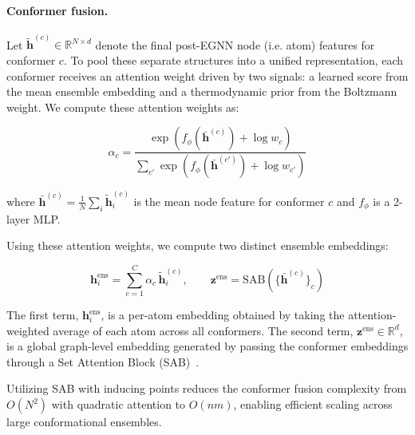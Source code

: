 \documentclass{article}
\begin{document}
\paragraph{Conformer fusion.}
Let $\tilde{\mathbf{h}}^{(c)} \in \mathbb{R}^{N \times d}$ denote the final post-EGNN node (i.e. atom) features for conformer $c$. To pool these separate structures into a unified representation, each conformer receives an attention weight driven by two signals: a learned score from the mean ensemble embedding and a thermodynamic prior from the Boltzmann weight. We compute these attention weights as:

\begin{equation}
  \alpha_c = \frac{\exp\!\left(f_\phi(\bar{\mathbf{h}}^{(c)}) + \log w_c\right)}
  {\sum_{c'}\exp\!\left(f_\phi(\bar{\mathbf{h}}^{(c')}) + \log w_{c'}\right)}
\end{equation}

where $\bar{\mathbf{h}}^{(c)} = \frac{1}{N}\sum_i \tilde{\mathbf{h}}_i^{(c)}$ is the mean node feature for conformer $c$ and $f_\phi$ is a 2-layer MLP. 

Using these attention weights, we compute two distinct ensemble embeddings:

\begin{equation}
  \mathbf{h}_i^{\mathrm{ens}} = \sum_{c=1}^C \alpha_c\,\tilde{\mathbf{h}}_i^{(c)},
  \qquad
  \mathbf{z}^{\mathrm{ens}} = \mathrm{SAB}\!\left(\{\bar{\mathbf{h}}^{(c)}\}_c\right)
\end{equation}

The first term, $\mathbf{h}_i^{\mathrm{ens}}$, is a per-atom embedding obtained by taking the attention-weighted average of each atom across all conformers. The second term, $\mathbf{z}^{\mathrm{ens}} \in \mathbb{R}^d$, is a global graph-level embedding generated by passing the conformer embeddings through a Set Attention Block (SAB)~\citep{lee2019set}. 

Utilizing SAB with inducing points reduces the conformer fusion complexity from $O(N^2)$ with quadratic attention to $O(nm)$, enabling efficient scaling across large conformational ensembles.
\end{document}
